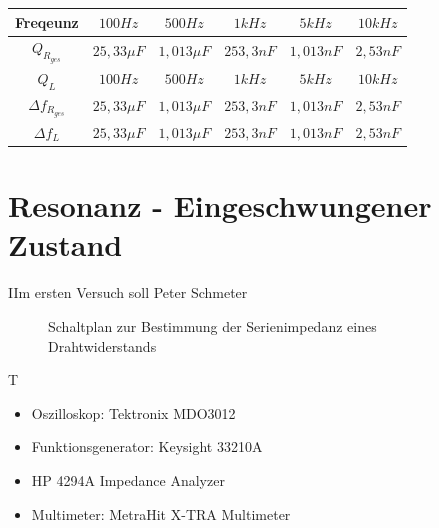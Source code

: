 \documentclass{article}
\begin{document}
\begin{center}

  \begin{tabular}{|c|c|c|c|c|c|}    
    \hline
    Freqeunz               & $100 Hz$                   & $500Hz$                   & $1kHz$            & $5kHz$          & $10kHz$              \\
    \hline
    $Q_{R_{ges}}$              & $25,33\mu F$               & $1,013\mu F$                     & $253,3nF$            & $1,013nF$           & $2,53nF$              \\
    \hline
    $Q_L$              & $100 Hz$                   & $500Hz$                   & $1kHz$            & $5kHz$          & $10kHz$              \\
    \hline
    $\Delta f_{R_{ges}}$              & $25,33\mu F$                      & $1,013\mu F$                     & $253,3nF$            & $1,013nF$           & $2,53nF$              \\
    \hline
    $\Delta f_L$              & $25,33\mu F$                      & $1,013\mu F$                     & $253,3nF$            & $1,013nF$           & $2,53nF$              \\
    \hline
  \end{tabular}

\end{center}



\newpage
\section{Resonanz - Eingeschwungener Zustand}
\begin{task}
  IIm ersten Versuch soll Peter Schmeter
\end{task}
\begin{figure}[h]
  \begin{center}

    \caption{Schaltplan zur Bestimmung der Serienimpedanz eines Drahtwiderstands}
  \end{center}
\end{figure}
\begin{devlist}
  T
  \begin{itemize}
    \item Oszilloskop: Tektronix MDO3012
    \item Funktionsgenerator: Keysight 33210A
    \item HP 4294A Impedance Analyzer
    \item Multimeter: MetraHit X-TRA Multimeter
  \end{itemize}
\end{devlist}
\end{document}
